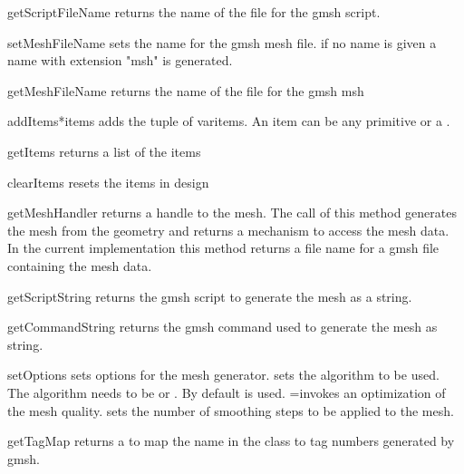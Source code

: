 \begin{methoddesc}[Design]{getScriptFileName}{}
returns the name of the file for the gmsh script.
\end{methoddesc}


\begin{methoddesc}[Design]{setMeshFileName}{}
sets the name for the gmsh  mesh file. if no name is given a name with extension "msh" is generated.
\end{methoddesc}

\begin{methoddesc}[Design]{getMeshFileName}{}
returns the name of the file for the gmsh msh
\end{methoddesc}


\begin{methoddesc}[Design]{addItems}{*items}
adds the tuple of var{items}. An item can be any primitive or a .

\end{methoddesc}

\begin{methoddesc}[Design]{getItems}{}
returns a list of the items
\end{methoddesc}

\begin{methoddesc}[Design]{clearItems}{}
resets the items in design
\end{methoddesc}

\begin{methoddesc}[Design]{getMeshHandler}{}
returns a handle to the mesh. The call of this method generates the mesh from the geometry and
returns a mechanism to access the mesh data. In the current implementation this
method returns a file name for a gmsh file containing the mesh data.
\end{methoddesc}

\begin{methoddesc}[Design]{getScriptString}{}
returns the gmsh script to generate the mesh as a string.
\end{methoddesc}

\begin{methoddesc}[Design]{getCommandString}{}
returns the gmsh command used to generate the mesh as string.
\end{methoddesc}

\begin{methoddesc}[Design]{setOptions}{}
sets options for the mesh generator.  sets the algorithm to be used.
The algorithm needs to be 
or . By default  is used. =\True invokes an optimization of the mesh quality.  sets the number of smoothing steps to be applied to the mesh.  
\end{methoddesc}

\begin{methoddesc}[Design]{getTagMap}{}
returns a  to map the name  in the class to tag numbers generated by gmsh.
\end{methoddesc}
